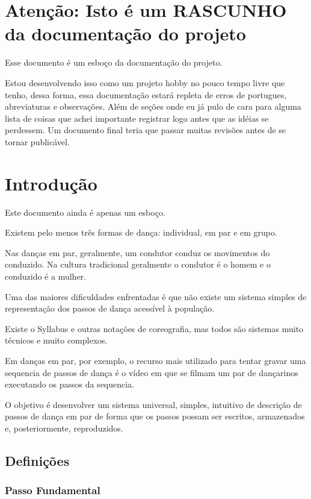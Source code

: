 
\section{Atenção: Isto é um RASCUNHO da documentação do projeto}

Esse documento é um esboço da documentação do projeto.

Estou desenvolvendo isso como um projeto hobby no pouco tempo livre que tenho, dessa forma, essa documentação estará repleta de erros de portugues, abreviaturas e observações. Além de seções onde eu já pulo de cara para alguma lista de coisas que achei importante registrar logo antes que as idéias se perdessem. Um documento final teria que passar muitas revisões antes de se tornar publicável.

\section{Introdução}


Este documento ainda é apenas um esboço.

Existem pelo menos três formas de dança: individual, em par e em grupo.

Nas danças em par, geralmente, um condutor conduz os movimentos do conduzido. Na cultura tradicional geralmente o condutor é o homem e o conduzido é a mulher. 

Uma das maiores dificuldades enfrentadas é que não existe um sistema simples de representação dos passos de dança acessível à população.

Existe o Syllabus e outras notações de coreografia, mas todos são sistemas muito técnicos e muito complexos.

Em danças em par, por exemplo, o recurso mais utilizado para tentar gravar uma sequencia de passos de dança é o vídeo em que se filmam um par de dançarinos executando os passos da sequencia.

O objetivo é desenvolver um sistema universal, simples, intuitivo de descrição de passos de dança em par de forma que os passos possam ser escritos, armazenados e, posteriormente, reproduzidos.


\subsection{Definições}


\subsubsection{Passo Fundamental}

